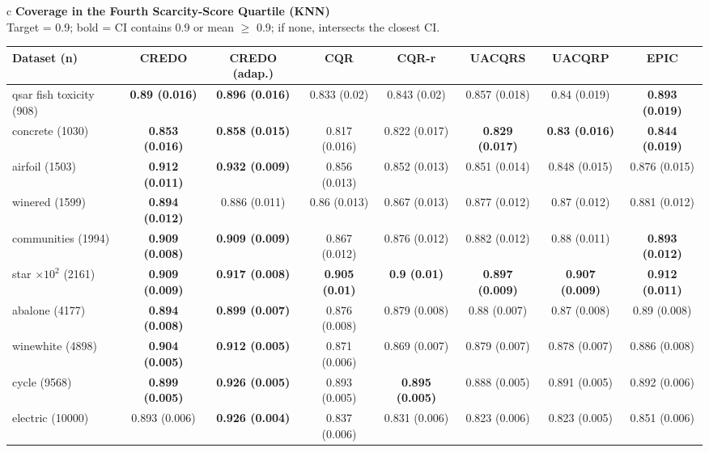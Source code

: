 \documentclass[border=6pt]{standalone}
\begin{document}
\begin{adjustbox}{max width=\linewidth}
\begin{tabular}{c}
{\small\textbf{Coverage in the Fourth Scarcity-Score Quartile (KNN)}}\\[-1pt]
{\scriptsize Target = 0.9; bold = CI contains 0.9 or mean $\geq$ 0.9; if none, intersects the closest CI.}\\[2pt]
\scriptsize\begin{tabular}{lccccccc}
\hline
Dataset (n) & \textbf{CREDO} & \textbf{CREDO (adap.)} & \textbf{CQR} & \textbf{CQR-r} & \textbf{UACQRS} & \textbf{UACQRP} & \textbf{EPIC}\\ \hline
qsar fish toxicity (908) & \textbf{0.89 (0.016)} & \textbf{0.896 (0.016)} & 0.833 (0.02) & 0.843 (0.02) & 0.857 (0.018) & 0.84 (0.019) & \textbf{0.893 (0.019)}\\
concrete (1030) & \textbf{0.853 (0.016)} & \textbf{0.858 (0.015)} & 0.817 (0.016) & 0.822 (0.017) & \textbf{0.829 (0.017)} & \textbf{0.83 (0.016)} & \textbf{0.844 (0.019)}\\
airfoil (1503) & \textbf{0.912 (0.011)} & \textbf{0.932 (0.009)} & 0.856 (0.013) & 0.852 (0.013) & 0.851 (0.014) & 0.848 (0.015) & 0.876 (0.015)\\
winered (1599) & \textbf{0.894 (0.012)} & 0.886 (0.011) & 0.86 (0.013) & 0.867 (0.013) & 0.877 (0.012) & 0.87 (0.012) & 0.881 (0.012)\\
communities (1994) & \textbf{0.909 (0.008)} & \textbf{0.909 (0.009)} & 0.867 (0.012) & 0.876 (0.012) & 0.882 (0.012) & 0.88 (0.011) & \textbf{0.893 (0.012)}\\
star $\times 10^2$ (2161) & \textbf{0.909 (0.009)} & \textbf{0.917 (0.008)} & \textbf{0.905 (0.01)} & \textbf{0.9 (0.01)} & \textbf{0.897 (0.009)} & \textbf{0.907 (0.009)} & \textbf{0.912 (0.011)}\\
abalone (4177) & \textbf{0.894 (0.008)} & \textbf{0.899 (0.007)} & 0.876 (0.008) & 0.879 (0.008) & 0.88 (0.007) & 0.87 (0.008) & 0.89 (0.008)\\
winewhite (4898) & \textbf{0.904 (0.005)} & \textbf{0.912 (0.005)} & 0.871 (0.006) & 0.869 (0.007) & 0.879 (0.007) & 0.878 (0.007) & 0.886 (0.008)\\
cycle (9568) & \textbf{0.899 (0.005)} & \textbf{0.926 (0.005)} & 0.893 (0.005) & \textbf{0.895 (0.005)} & 0.888 (0.005) & 0.891 (0.005) & 0.892 (0.006)\\
electric (10000) & 0.893 (0.006) & \textbf{0.926 (0.004)} & 0.837 (0.006) & 0.831 (0.006) & 0.823 (0.006) & 0.823 (0.005) & 0.851 (0.006)\\

\end{tabular}
\end{tabular}
\end{adjustbox}
\end{document}
